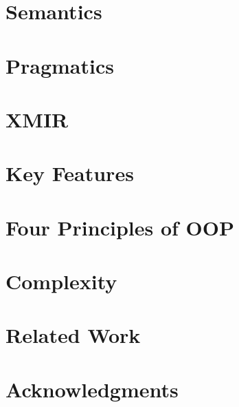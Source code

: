 \documentclass[sigplan,nonacm,natbib=false]{acmart}
\begin{document}
\section{Semantics}
\label{sec:semantics}


\section{Pragmatics}
\label{sec:pragmatics}


\section{XMIR}
\label{sec:xmir}


\section{Key Features}
\label{sec:features}


\section{Four Principles of OOP}
\label{sec:four}


\section{Complexity}
\label{sec:complexity}


\section{Related Work}
\label{sec:related}


\section{Acknowledgments}


\printbibliography

\clearpage
\end{document}
